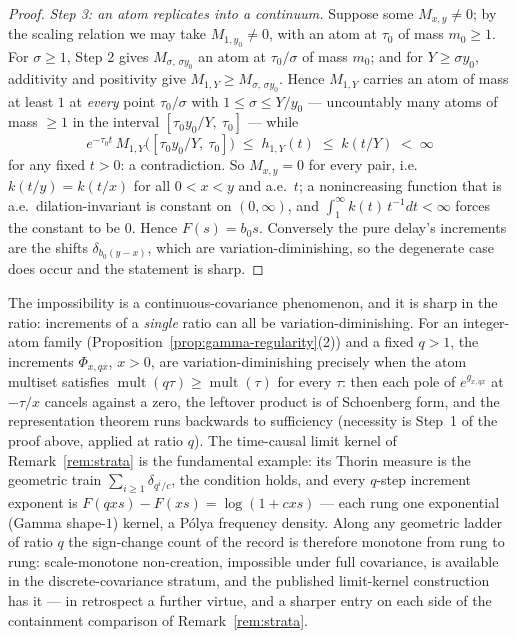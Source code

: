 \begin{proof}
\emph{Step 3: an atom replicates into a continuum.} Suppose some $M_{x,y} \ne 0$; by the
scaling relation we may take $M_{1,y_0} \ne 0$, with an atom at $\tau_0$ of mass
$m_0 \ge 1$. For $\sigma \ge 1$, Step 2 gives $M_{\sigma,\, \sigma y_0}$ an atom at
$\tau_0/\sigma$ of mass $m_0$; and for $Y \ge \sigma y_0$, additivity and positivity give
$M_{1,Y} \ge M_{\sigma,\, \sigma y_0}$. Hence $M_{1,Y}$ carries an atom of mass at least
$1$ at \emph{every} point $\tau_0/\sigma$ with $1 \le \sigma \le Y/y_0$ --- uncountably
many atoms of mass $\ge 1$ in the interval $[\tau_0 y_0/Y,\ \tau_0]$ --- while
\[
  e^{-\tau_0 t}\, M_{1,Y}\bigl([\tau_0 y_0/Y,\ \tau_0]\bigr)
  \;\le\; h_{1,Y}(t) \;\le\; k(t/Y) \;<\; \infty
\]
for any fixed $t > 0$: a contradiction. So $M_{x,y} = 0$ for every pair, i.e.\
$k(t/y) = k(t/x)$ for all $0 < x < y$ and a.e.\ $t$; a nonincreasing function that is
a.e.\ dilation-invariant is constant on $(0,\infty)$, and
$\int_1^\infty k(t)\,t^{-1}dt < \infty$ forces the constant to be $0$. Hence
$F(s) = b_0 s$. Conversely the pure delay's increments are the shifts
$\delta_{b_0(y-x)}$, which are variation-diminishing, so the degenerate case does occur
and the statement is sharp.
\end{proof}

\begin{remark}\label{rem:ladder-vd}
The impossibility is a continuous-covariance phenomenon, and it is sharp in the ratio:
increments of a \emph{single} ratio can all be variation-diminishing. For an integer-atom
family (Proposition~\ref{prop:gamma-regularity}(2)) and a fixed $q > 1$, the increments
$\Phi_{x,qx}$, $x > 0$, are variation-diminishing precisely when the atom multiset
satisfies $\operatorname{mult}(q\tau) \ge \operatorname{mult}(\tau)$ for every $\tau$:
then each pole of $e^{g_{x,qx}}$ at $-\tau/x$ cancels against a zero, the leftover
product is of Schoenberg form, and the representation theorem runs backwards to
sufficiency (necessity is Step~1 of the proof above, applied at ratio $q$). The
time-causal limit kernel of Remark~\ref{rem:strata} is the fundamental example: its
Thorin measure is the geometric train $\sum_{i \ge 1}\delta_{q^i/c}$, the condition
holds, and every $q$-step increment exponent is
$F(qxs) - F(xs) = \log(1 + cxs)$ --- each rung one exponential (Gamma shape-$1$) kernel,
a P\'olya frequency density. Along any geometric ladder of ratio $q$ the sign-change
count of the record is therefore monotone from rung to rung: scale-monotone
non-creation, impossible under full covariance, is available in the discrete-covariance
stratum, and the published limit-kernel construction has it --- in retrospect a further
virtue, and a sharper entry on each side of the containment comparison of
Remark~\ref{rem:strata}.
\end{remark}


